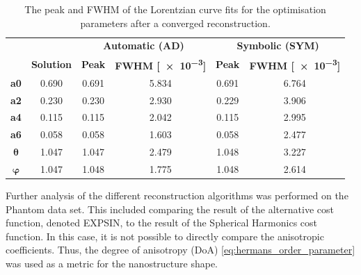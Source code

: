 \begin{table}[h!]
    \centering
    \caption{  The peak and FWHM of the Lorentzian curve fits
        for the optimisation parameters after a converged reconstruction.}
    \label{tab:curve_fitting}
    \begin{tabular}{ c c c c c c }
        \hline %
        \textbf{}      &                   & \multicolumn{2}{c}{\textbf{Automatic (AD)}} & \multicolumn{2}{c}{\textbf{Symbolic (SYM)}}                                             \\
        \textbf{}      & \textbf{Solution} & \textbf{Peak}                               & \textbf{FWHM [\num{e-3}]}                   & \textbf{Peak} & \textbf{FWHM [\num{e-3}]} \\
        \hline %
        \textbf{a0}    & 0.690             & 0.691                                       & 5.834                                       & 0.691         & 6.764                     \\
        \textbf{a2}    & 0.230             & 0.230                                       & 2.930                                       & 0.229         & 3.906                     \\
        \textbf{a4}    & 0.115             & 0.115                                       & 2.042                                       & 0.115         & 2.995                     \\
        \textbf{a6}    & 0.058             & 0.058                                       & 1.603                                       & 0.058         & 2.477                     \\
        $\bm{\theta}$  & 1.047             & 1.047                                       & 2.479                                       & 1.048         & 3.227                     \\
        $\bm{\varphi}$ & 1.047             & 1.048                                       & 1.775                                       & 1.048         & 2.614                     \\
        \hline %
    \end{tabular}
\end{table}

\clearpage

Further analysis of the different reconstruction algorithms was performed on the Phantom data set.
This included comparing the result of the alternative cost function, denoted EXPSIN, to the result of the Spherical Harmonics cost function.
In this case, it is not possible to directly compare the anisotropic coefficients. Thus, the degree of anisotropy (DoA) \eqref{eq:hermans_order_parameter} was used as a metric for the nanostructure shape.

